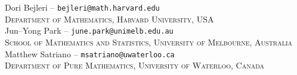 \documentclass[a4paper,12pt]{amsart}
\theoremstyle{definition}
\begin{document}
	
	
	
	
	\vspace{+9pt}
	
	
	\noindent Dori Bejleri \enspace -- \enspace \texttt{bejleri@math.harvard.edu} \\
	\textsc{Department of Mathematics, Harvard University, USA} \\
	
	
	
	
	\noindent Jun--Yong Park \enspace -- \enspace \texttt{june.park@unimelb.edu.au} \\
	\textsc{School of Mathematics and Statistics, University of Melbourne, Australia} \\
	
	
	
	\noindent Matthew Satriano \enspace -- \enspace \texttt{msatriano@uwaterloo.ca} \\
	\textsc{Department of Pure Mathematics, University of Waterloo, Canada} \\
	
	
	
	
	
	
	
	
\end{document}
